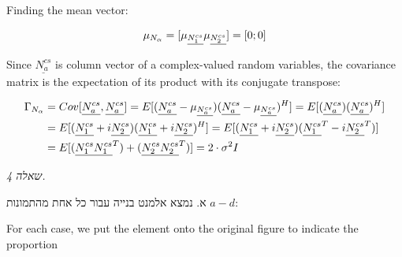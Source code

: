 \documentclass[a4paper]{iacas}
\begin{document}
Finding the mean vector:

\begin{align*}
\mu_{N_{\alpha}} = [\mu_{\underline{N_1^{cs}}}  \mu_{\underline{N_2^{cs}}} ] = [ 0 ; 0 ] 
\end{align*}

Since $\underline{N_a^{cs}}$ is column vector of a complex-valued random variables, the covariance matrix is the expectation of its product with its conjugate transpose:


\begin{align*}
\Gamma_{N_{\alpha}} &= Cov[\underline{N_a^{cs}} ,\underline{N_a^{cs}}] = E[(\underline{N_a^{cs}} - \mu_{\underline{N_a^{cs}}})(\underline{N_a^{cs}} - \mu_{\underline{N_a^{cs}}})^H] = E[(\underline{N_a^{cs}})(\underline{N_a^{cs}})^H] \\ 
&= E[(\underline{N_1^{cs}} + i\underline{N_2^{cs}})(\underline{N_1^{cs}} + i\underline{N_2^{cs}})^H]  =  E[(\underline{N_1^{cs}} + i\underline{N_2^{cs}})(\underline{N_1^{cs}}^{T} - i\underline{N_2^{cs}}^{T})]   \\ 
&= E[(\underline{N_1^{cs}}\underline{N_1^{cs}}^{T}) +(\underline{N_2^{cs}}\underline{N_2^{cs}}^{T})]= 2\cdot\sigma^{2}I
\end{align*}


\newpage

\begin{hebrew}
\textit{\huge שאלה 4.}

א. נמצא אלמנט בנייה עבור כל אחת מהתמונות $a-d$:
\end{hebrew}

For each case, we put the element onto the original figure to indicate the proportion
\end{document}
